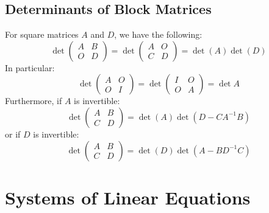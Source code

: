 \documentclass[../main.tex]{subfiles}
\begin{document}
\subsection{Determinants of Block Matrices}
\label{blockDeterminants}
\nonexaminable
For square matrices $A$ and $D$, we have the following:
\[
  \det \left(\begin{array}{c|c}
    A & B \\ \hline
    O & D
  \end{array}\right) =
  \det \left(\begin{array}{c|c}
    A & O \\ \hline
    C & D
  \end{array}\right) =
  \det(A)\det(D)
\]
In particular:
\[
  \det \left(\begin{array}{c|c}
    A & O \\ \hline
    O & I
  \end{array}\right) =
  \det \left(\begin{array}{c|c}
    I & O \\ \hline
    O & A
  \end{array}\right) =
  \det A
\]
Furthermore, if $A$ is invertible:
\[
  \det \left(\begin{array}{c|c}
    A & B \\ \hline
    C & D
  \end{array}\right) =
  \det(A)\det(D - CA^{-1}B)
\]
or if $D$ is invertible:
\[
  \det \left(\begin{array}{c|c}
    A & B \\ \hline
    C & D
  \end{array}\right) =
  \det(D)\det(A - BD^{-1}C)
\]
\section{Systems of Linear Equations} \label{systemsLinearEquations}
\end{document}
